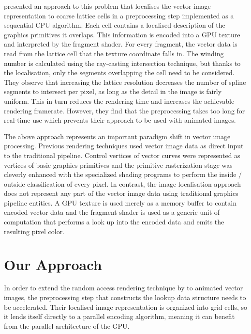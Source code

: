 \documentclass[11pt,a4paper,twoside]{article}
\begin{document}
\cite{NehabHoppe08} presented an approach to this problem that localises the vector image representation to coarse lattice cells in a preprocessing step implemented as a sequential CPU algorithm. Each cell contains a localised description of the graphics primitives it overlaps. This information is encoded into a GPU texture and interpreted by the fragment shader. For every fragment, the vector data is read from the lattice cell that the texture coordinate falls in. The winding number is calculated using the ray-casting intersection technique, but thanks to the localisation, only the segments overlapping the cell need to be considered. They observe that increasing the lattice resolution decreases the number of spline segments to intersect per pixel, as long as the detail in the image is fairly uniform. This in turn reduces the rendering time and increases the achievable rendering framerate. However, they find that the preprocessing takes too long for real-time use which prevents their approach to be used with animated images.

The above approach represents an important paradigm shift in vector image processing. Previous rendering techniques used vector image data as direct input to the traditional pipeline. Control vertices of vector curves were represented as vertices of basic graphics primitives and the primitive rasterization stage was cleverly enhanced with the specialized shading programs to perform the inside / outside classification of every pixel. In contrast, the image localisation approach does not represent any part of the vector image data using traditional graphics pipeline entities. A GPU texture is used merely as a memory buffer to contain encoded vector data and the fragment shader is used as a generic unit of computation that performs a look up into the encoded data and emits the resulting pixel color.

\section {Our Approach}
\label{sec:our}

In order to extend the random access rendering technique by \cite{NehabHoppe08} to animated vector images, the preprocessing step that constructs the lookup data structure needs to be accelerated. Their localised image representation is organized into grid cells, so it lends itself directly to a parallel encoding algorithm, meaning it can benefit from the parallel architecture of the GPU.
\end{document}
